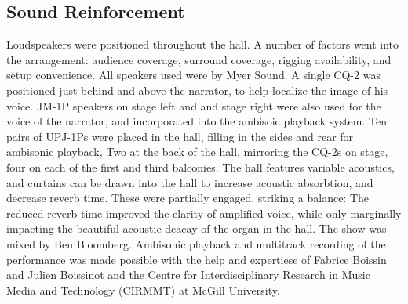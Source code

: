 \subsection{Sound Reinforcement}
\label{sec:sound-reinforcement}
Loudspeakers were positioned throughout the hall. A number of factors
went into the arrangement: audience coverage, surround coverage,
rigging availability, and setup convenience. All speakers used were by
Myer Sound. A single CQ-2
was positioned just behind and above the narrator, to help localize
the image of his voice.  JM-1P speakers on stage left and and stage
right were also used for the voice of the narrator, and incorporated
into the ambisoic playback system. Ten pairs of UPJ-1Ps were placed in
the hall, filling in the sides and rear for ambisonic playback, Two at
the back of the hall, mirroring the CQ-2s on stage, four on each of
the first and third balconies.  The hall features variable acoustics,
and curtains can be drawn into the hall to increase acoustic
absorbtion, and decrease reverb time. These were partially engaged,
striking a balance: The reduced reverb time improved the clarity of
amplified voice, while only marginally impacting the beautiful
acoustic deacay of the organ in the hall. The show was mixed by Ben
Bloomberg. Ambisonic playback and multitrack recording of the
performance was made possible with the help and expertiese of Fabrice
Boissin and Julien Boissinot and the Centre for Interdisciplinary
Research in Music Media and Technology (CIRMMT) at McGill University.







